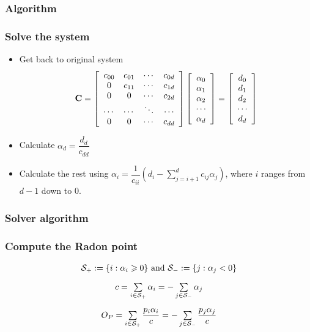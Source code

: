 \documentclass{beamer}
\begin{document}
\begin{frame}
\frametitle{Algorithm}
\algI
\end{frame}

\begin{frame}
\frametitle{Solve the system}
\begin{itemize}[<+->]
\item	Get back to original system
		\begin{equation*}
		\mathbf{C}=
		\left[ \begin{array}{c c c c}
			c_{00}&c_{01}&\cdots&c_{0d}\\
			0&c_{11}&\cdots&c_{1d}\\
			0&0&\cdots&c_{2d}\\
			\cdots&\cdots&\ddots&\cdots\\
			0&0&\cdots&c_{dd}
		\end{array}\right]
		\left[ \begin{array}{c}
			\alpha_0\\
			\alpha_1\\
			\alpha_2\\
			\cdots\\
			\alpha_d
		\end{array}\right]
		=
		\left[ \begin{array}{c}
			d_0\\
			d_1\\
			d_2\\
			\cdots\\
			d_d
		\end{array}\right]
		\end{equation*}
\item	Calculate $\alpha_d = \dfrac{d_d}{c_{dd}}$
\item	Calculate the rest using $\alpha_i=\dfrac{1}{c_{ii}}\left( d_i - \sum\limits_{j=i+1}^{d}c_{ij}\alpha_j\right)$,
		where $i$ ranges from $d-1$ down to $0$.
\end{itemize}
\end{frame}

\begin{frame}
	\frametitle{Solver algorithm}
\end{frame}

\begin{frame}
\frametitle{Compute the Radon point}
\begin{equation*}
\begin{array}{c}
\vspace{10pt} \mathcal{S}_{+}:=\{i:\alpha_i\geqslant 0\} \text{ and } \mathcal{S}_{-}:=\{j:\alpha_j < 0\}\\
\vspace{10pt} c = \sum\limits_{i\in\mathcal{S}_{+}} \alpha_i = - \sum\limits_{j\in\mathcal{S}_{-}} \alpha_j\\
\vspace{10pt} O_P = \sum\limits_{i\in\mathcal{S}_{+}}\dfrac{p_i\alpha_i}{c} = - \sum\limits_{j\in\mathcal{S}_{-}}\dfrac{p_j\alpha_j}{c}
\end{array}
\end{equation*}
\end{frame}
\end{document}

